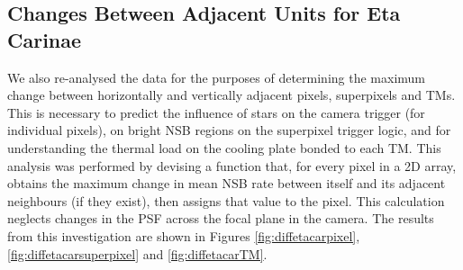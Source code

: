 \subsection{Changes Between Adjacent Units for Eta Carinae}
\label{sec:etacarajacent}

We also re-analysed the data for the purposes of determining the maximum change between horizontally and vertically adjacent pixels, superpixels and TMs. This is necessary to predict the influence of stars on the camera trigger (for individual pixels), on bright NSB regions on the superpixel trigger logic, and for understanding the thermal load on the cooling plate bonded to each TM. This analysis was performed by devising a function that, for every pixel in a 2D array, obtains the maximum change in mean NSB rate between itself and its adjacent neighbours (if they exist), then assigns that value to the pixel. This calculation neglects changes in the PSF across the focal plane in the camera. The results from this investigation are shown in Figures \ref{fig:diffetacarpixel}, \ref{fig:diffetacarsuperpixel} and \ref{fig:diffetacarTM}.



